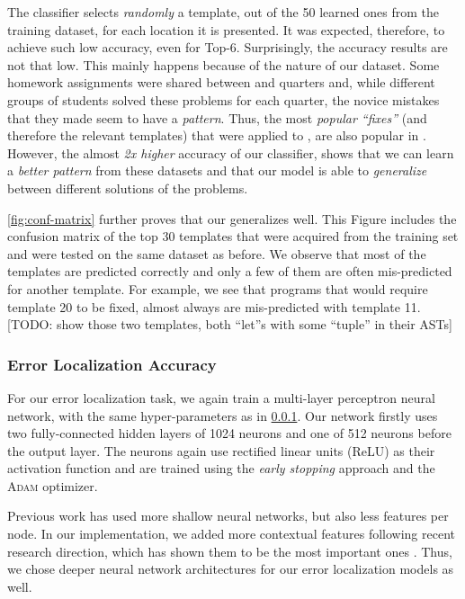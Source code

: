 The \random classifier selects \emph{randomly} a template, out of the 50 learned
ones from the \SPRING training dataset, for each location it is presented. It
was expected, therefore, to achieve such low accuracy, even for Top-6.
Surprisingly, the \popular accuracy results are not that low. This mainly
happens because of the nature of our dataset. Some homework assignments were
shared between \SPRING and \FALL quarters and, while different groups of
students solved these problems for each quarter, the novice mistakes that they
made seem to have a \emph{pattern}. Thus, the most \emph{popular ``fixes''} (and
therefore the relevant templates) that were applied to \SPRING, are also popular
in \FALL. However, the almost \emph{2x higher} accuracy of our \dnn classifier,
shows that we can learn a \emph{better pattern} from these datasets and that our
\dnn model is able to \emph{generalize} between different solutions of the
problems.

\autoref{fig:conf-matrix} further proves that our \dnn generalizes well. This
Figure includes the confusion matrix of the top 30 templates that were acquired
from the training set and were tested on the same \FALL dataset as before. We
observe that most of the templates are predicted correctly and only a few of
them are often mis-predicted for another template. For example, we see that
programs that would require template 20 to be fixed, almost always are
mis-predicted with template 11. [TODO: show those two templates, both ``let''s
with some ``tuple'' in their ASTs]

\subsubsection{Error Localization Accuracy}
\label{subsubsec:error_loc_acc}

For our error localization task, we again train a multi-layer perceptron neural
network, with the same hyper-parameters as in \ref{subsubsec:error_loc_acc}. Our
network firstly uses two fully-connected hidden layers of 1024 neurons and one
of 512 neurons before the output layer. The neurons again use rectified linear
units (ReLU) as their activation function and are trained using the \emph{early
stopping} approach and the \textsc{Adam} optimizer.

Previous work \citep[][]{Seidel:2017} has used more shallow neural networks, but
also less features per node. In our implementation, we added more contextual
features following recent research direction, which has shown them to be the
most important ones \citep[TODO: add the lstm paper][]{Seidel:2017}. Thus, we
chose deeper neural network architectures for our error localization models as
well.

